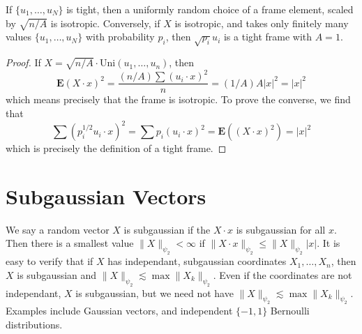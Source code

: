 \begin{theorem}
    If $\{ u_1, \dots, u_N \}$ is tight, then a uniformly random choice of a frame element, scaled by $\sqrt{n/A}$ is isotropic. Conversely, if $X$ is isotropic, and takes only finitely many values $\{ u_1, \dots, u_N \}$ with probability $p_i$, then $\sqrt{p_i} u_i$ is a tight frame with $A = 1$.
\end{theorem}
\begin{proof}
    If $X = \sqrt{n/A} \cdot \text{Uni}(u_1, \dots, u_n)$, then
    \[ \mathbf{E} (X \cdot x)^2 = \frac{(n/A) \sum (u_i \cdot x)^2}{n} = (1/A) A|x|^2 = |x|^2 \]
    which means precisely that the frame is isotropic. To prove the converse, we find that
    \[ \sum (p_i^{1/2} u_i \cdot x)^2 = \sum p_i (u_i \cdot x)^2 = \mathbf{E}((X \cdot x)^2) = |x|^2 \]
    which is precisely the definition of a tight frame.
\end{proof}

\section{Subgaussian Vectors}

We say a random vector $X$ is subgaussian if the $X \cdot x$ is subgaussian for all $x$. Then there is a smallest value $\| X \|_{\psi_2} < \infty$ if $\| X \cdot x \|_{\psi_2} \leq \| X \|_{\psi_2} |x|$. It is easy to verify that if $X$ has independant, subgaussian coordinates $X_1, \dots, X_n$, then $X$ is subgaussian and $\| X \|_{\psi_2} \lesssim \max \| X_k \|_{\psi_2}$. Even if the coordinates are not independant, $X$ is subgaussian, but we need not have $\| X \|_{\psi_2} \lesssim \max \| X_k \|_{\psi_2}$. Examples include Gaussian vectors, and independent $\{ -1, 1 \}$ Bernoulli distributions.

